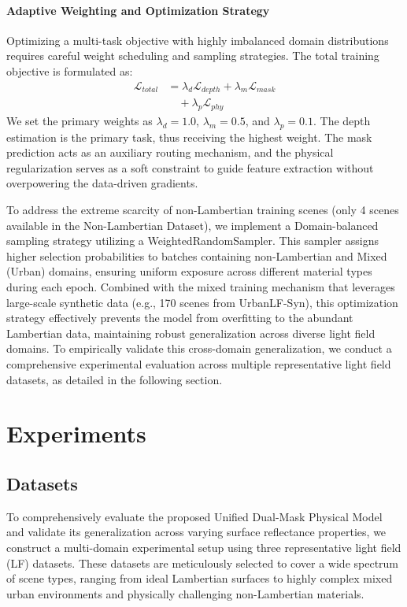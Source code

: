 \documentclass[lettersize,journal]{IEEEtran}
\begin{document}
\paragraph{Adaptive Weighting and Optimization Strategy}
Optimizing a multi-task objective with highly imbalanced domain distributions requires careful weight scheduling and sampling strategies. The total training objective is formulated as:
\begin{equation}
\begin{aligned}
\mathcal{L}_{total} &= \lambda_d \mathcal{L}_{depth} + \lambda_m \mathcal{L}_{mask} \\
&\quad + \lambda_p \mathcal{L}_{phy}
\end{aligned}
\end{equation}
We set the primary weights as $\lambda_d = 1.0$, $\lambda_m = 0.5$, and $\lambda_p = 0.1$. The depth estimation is the primary task, thus receiving the highest weight. The mask prediction acts as an auxiliary routing mechanism, and the physical regularization serves as a soft constraint to guide feature extraction without overpowering the data-driven gradients.

To address the extreme scarcity of non-Lambertian training scenes (only 4 scenes available in the Non-Lambertian Dataset), we implement a Domain-balanced sampling strategy utilizing a WeightedRandomSampler. This sampler assigns higher selection probabilities to batches containing non-Lambertian and Mixed (Urban) domains, ensuring uniform exposure across different material types during each epoch. Combined with the mixed training mechanism that leverages large-scale synthetic data (e.g., 170 scenes from UrbanLF-Syn), this optimization strategy effectively prevents the model from overfitting to the abundant Lambertian data, maintaining robust generalization across diverse light field domains. To empirically validate this cross-domain generalization, we conduct a comprehensive experimental evaluation across multiple representative light field datasets, as detailed in the following section.

\section{Experiments}

\subsection{Datasets}

To comprehensively evaluate the proposed Unified Dual-Mask Physical Model and validate its generalization across varying surface reflectance properties, we construct a multi-domain experimental setup using three representative light field (LF) datasets. These datasets are meticulously selected to cover a wide spectrum of scene types, ranging from ideal Lambertian surfaces to highly complex mixed urban environments and physically challenging non-Lambertian materials. 
\end{document}
